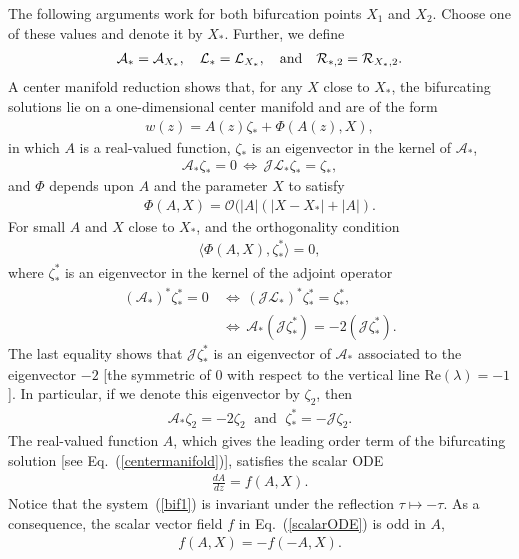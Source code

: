 The following arguments work for both bifurcation points $X_1$ and $X_2$.  Choose one of these values and denote it by $X_*$.  Further, we define
%
\begin{align}
\mathcal{A}_* = \mathcal{A}_{X_*}, \quad 
\mathcal{L}_* = \mathcal{L}_{X_*}, \quad {\rm and} \quad
\mathcal{R}_{*,2} = \mathcal{R}_{X_*, 2}.
\nonumber
\end{align}
A center manifold reduction shows that, for any $X$ close to $X_*$, the bifurcating solutions lie on a one-dimensional center manifold and are of the form
\begin{align}
w(z) = A(z)\zeta_* + \Phi (A(z), X), 
\label{centermanifold}
\end{align}
in which $A$ is a real-valued function, $\zeta_*$ is an eigenvector in the kernel of $\mathcal{A}_*$,
\begin{align}
\mathcal{A}_*\zeta_* = 0 \, \Leftrightarrow \, \mathcal{J} \mathcal{L}_* \zeta_* = \zeta_*,
\end{align}
and $\Phi$ depends upon $A$ and the parameter $X$ to satisfy
\begin{align}
\Phi(A,X) = \mathcal{O} (|A| (|X - X_*| + |A|).
\nonumber
\end{align}
For small $A$ and $X$ close to $X_*$, and the orthogonality condition
\begin{align}
\langle \Phi(A, X), \zeta_*^* \rangle = 0,
\nonumber
\end{align}
where $\zeta_*^*$ is an eigenvector in the kernel of the adjoint operator
\begin{align}
(\mathcal{A}_{*})^* \zeta_*^* = 0 \, &\Leftrightarrow \, ( \mathcal{J} \mathcal{L}_* )^* \zeta_*^* = \zeta_*^*, \\
&\Leftrightarrow \, \mathcal{A}_{*} (\mathcal{J}\zeta_*^* ) = -2 (\mathcal{J} \zeta_*^*).
\nonumber
\end{align}
The last equality shows that $\mathcal{J}\zeta_*^*$ is an eigenvector of $\mathcal{A}_{*}$ associated to the eigenvector $-2$ [the symmetric of 0 with respect to the vertical line Re$(\lambda) = -1$].  In particular, if we denote this eigenvector by $\zeta_2$, then
\begin{align}
\mathcal{A}_{*} \zeta_2 = -2 \zeta_2 \; \mbox{~and~}  \; \zeta_*^* = -\mathcal{J} \zeta_2.
\nonumber
\end{align}
The real-valued function $A$, which gives the leading order term of the bifurcating solution [see Eq.~(\ref{centermanifold})], satisfies the scalar ODE
\begin{align}
\frac{dA}{dz} = f(A, X). 
\label{scalarODE}
\end{align}
%
Notice that the system~(\ref{bif1}) is invariant under the reflection $\tau \mapsto - \tau$.  As a consequence, the scalar vector field $f$ in Eq.~(\ref{scalarODE}) is odd in $A$,
\begin{align}
f(A,X) = - f(-A,X).
\nonumber
\end{align}

